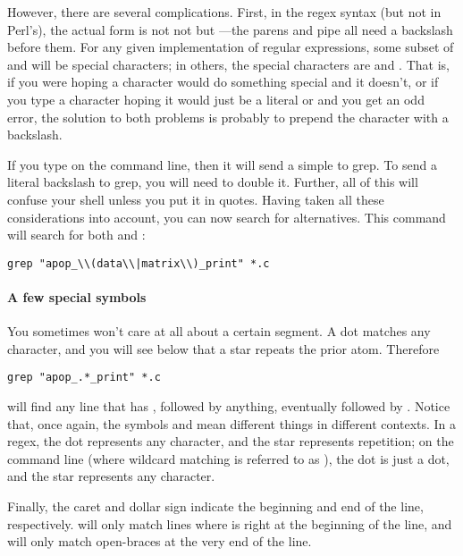However, there are several complications. First, in the
 regex syntax (but not in Perl's), the actual form is not
not  but ---the
parens and pipe all need a backslash before them. For any given
implementation of regular expressions, some subset of 
and \ci{\}} will be special characters; in others, the special characters are
 and \ci{\textbs\}}.
That is, if you were hoping a character would do something special and it
doesn't,  or if you type a character hoping
it would just be a literal \ci{+} or \ci{|} and you get an odd error,
the solution to both problems is probably to prepend the character with a backslash.

If you type \ci{$\backslash$|} on the command line, then it will send a
simple \ci{|} to grep. To send a literal backslash to grep, you will
need to double it. Further, all of this will confuse your shell unless
you put it in quotes. Having taken all these considerations into
account, you can now search for alternatives. This command will search
for both  and :
\begin{lstlisting}
grep "apop_\\(data\\|matrix\\)_print" *.c
\end{lstlisting}

\paragraph{A few special symbols}
You sometimes won't care at all about a certain segment. A 
dot matches any character, and you will see below that a star 
repeats the prior atom. Therefore
\begin{lstlisting}
grep "apop_.*_print" *.c
\end{lstlisting}
will find any line that has , followed by anything,
eventually followed by . Notice that, once again, the
symbols  and \ci{*} mean different things in different contexts.
In a regex, the dot represents any character, and the star represents
repetition; on the command line (where wildcard matching is referred to
as ), the dot is just a dot, and the star represents any
character.

Finally, the caret and dollar sign indicate the beginning and end of the
line, respectively.   will only match
lines where  is right at the beginning of the line, and 
 will only match open-braces at the very end of the
line. 

